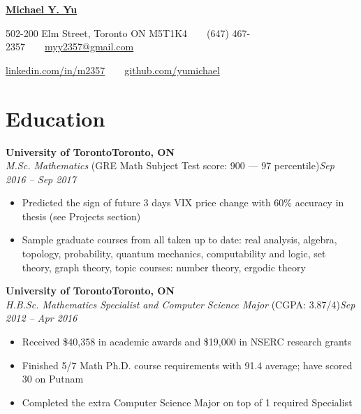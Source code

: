 \documentclass[10pt,letterpaper]{article}
\newcommand*\company[1]{\textbf{#1}}
\newcommand*\position[1]{\textit{#1}}
\newcommand*\location\company
\newcommand*\timespan\position
\begin{document}
\pagestyle{empty}
\begin{center}
{\huge\textbf{\href{https://github.com/yumichael/resume-v5}{Michael Y. Yu}}}

502-200 Elm Street, Toronto ON M5T1K4\ \ \textbullet\ \ (647) 467-2357\ \ \textbullet\ \ \href{mailto:myy2357@gmail.com}{myy2357@gmail.com}

\href{https://www.linkedin.com/in/m2357/}{linkedin.com/in/m2357}\ \ \textbullet\ \ \href{https://github.com/yumichael}{github.com/yumichael}
\end{center}
\section*{Education}
\company{University of Toronto}\hfill\location{Toronto, ON}\\
\position{M.Sc. Mathematics} (GRE Math Subject Test score: 900 --- 97 percentile)\hfill\timespan{Sep 2016 -- Sep 2017}
\begin{itemize}
\item Predicted the sign of future 3 days VIX price change with 60\% accuracy in thesis (see Projects section)
\item Sample graduate courses from all taken up to date: real analysis, algebra, topology, probability, quantum mechanics, computability and logic, set theory, graph theory, topic courses: number theory, ergodic theory
\end{itemize}
\company{University of Toronto}\hfill\location{Toronto, ON}\\
\position{H.B.Sc. Mathematics Specialist and Computer Science Major} (CGPA: 3.87/4)\hfill\timespan{Sep 2012 -- Apr 2016}
\begin{itemize}
\item Received \$40,358 in academic awards and \$19,000 in NSERC research grants
\item Finished 5/7 Math Ph.D. course requirements with 91.4 average; have scored 30 on Putnam
\item Completed the extra Computer Science Major on top of 1 required Specialist
\end{itemize}
\end{document}
